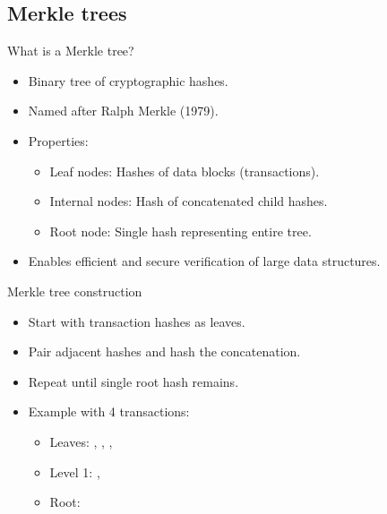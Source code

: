 \documentclass[aspectratio=169, lualatex, handout]{beamer}
\begin{document}
\subsection{Merkle trees}

\begin{frame}{What is a Merkle tree?}
	\begin{itemize}
		\item Binary tree of cryptographic hashes.
		\item Named after Ralph Merkle (1979).
		\item Properties:
		      \begin{itemize}
			      \item Leaf nodes: Hashes of data blocks (transactions).
			      \item Internal nodes: Hash of concatenated child hashes.
			      \item Root node: Single hash representing entire tree.
		      \end{itemize}
		\item Enables efficient and secure verification of large data structures.
	\end{itemize}
\end{frame}

\begin{frame}{Merkle tree construction}
	\begin{itemize}
		\item Start with transaction hashes as leaves.
		\item Pair adjacent hashes and hash the concatenation.
		\item Repeat until single root hash remains.
		\item Example with 4 transactions:
		      \begin{itemize}
			      \item Leaves: , , , 
			      \item Level 1: , 
			      \item Root: 
		      \end{itemize}
	\end{itemize}
\end{frame}
\end{document}
